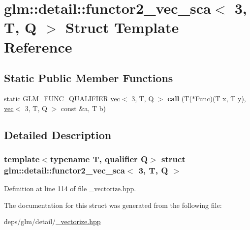 \hypertarget{structglm_1_1detail_1_1functor2__vec__sca_3_013_00_01T_00_01Q_01_4}{}\section{glm\+:\+:detail\+:\+:functor2\+\_\+vec\+\_\+sca$<$ 3, T, Q $>$ Struct Template Reference}
\label{structglm_1_1detail_1_1functor2__vec__sca_3_013_00_01T_00_01Q_01_4}
\subsection*{Static Public Member Functions}
\begin{DoxyCompactItemize}
\item 
\mbox{\label{structglm_1_1detail_1_1functor2__vec__sca_3_013_00_01T_00_01Q_01_4_ac197b76d56eec6695892213bbb6bfab9}} 
static G\+L\+M\+\_\+\+F\+U\+N\+C\+\_\+\+Q\+U\+A\+L\+I\+F\+I\+ER \hyperlink{structglm_1_1vec}{vec}$<$ 3, T, Q $>$ {\bfseries call} (T($\ast$Func)(T x, T y), \hyperlink{structglm_1_1vec}{vec}$<$ 3, T, Q $>$ const \&a, T b)
\end{DoxyCompactItemize}


\subsection{Detailed Description}
\subsubsection*{template$<$typename T, qualifier Q$>$\newline
struct glm\+::detail\+::functor2\+\_\+vec\+\_\+sca$<$ 3, T, Q $>$}



Definition at line 114 of file \+\_\+vectorize.\+hpp.



The documentation for this struct was generated from the following file\+:\begin{DoxyCompactItemize}
\item 
deps/glm/detail/\hyperlink{__vectorize_8hpp}{\+\_\+vectorize.\+hpp}\end{DoxyCompactItemize}
